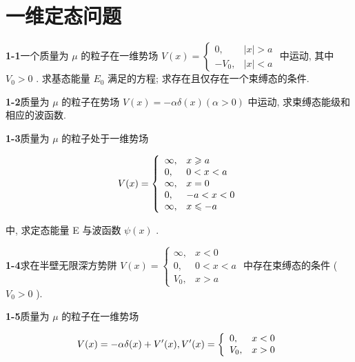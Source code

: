 \chapter{一维定态问题}

\newpage


\textbf{1-1}\quad 一个质量为 $\displaystyle \mu$ 的粒子在一维势场 $\displaystyle V(x) = \begin{cases} 0, & |x| > a \\ -V_0, & |x| < a \end{cases}$ 中运动, 其中 $\displaystyle V_0 > 0$ . 求基态能量 $\displaystyle E_0$ 满足的方程; 求存在且仅存在一个束缚态的条件.

\vfill

\newpage

\textbf{1-2}\quad 质量为 $\displaystyle \mu$ 的粒子在势场 $\displaystyle V(x) = -\alpha \delta (x)(\alpha >0)$ 中运动, 求束缚态能级和相应的波函数.

\vfill

\newpage

\textbf{1-3}\quad 质量为 $\displaystyle \mu$ 的粒子处于一维势场

$$
V (x) = \left\{ \begin{array}{l l} \infty , & x \geqslant a \\ 0, & 0 <   x <   a \\ \infty , & x = 0 \\ 0, & - a <   x <   0 \\ \infty , & x \leqslant - a \end{array} \right.
$$

中, 求定态能量 E 与波函数 $\displaystyle \psi(x)$ .

\vfill

\newpage

\textbf{1-4}\quad 求在半壁无限深方势阱 $\displaystyle V(x) = \begin{cases} \infty, & x < 0 \\ 0, & 0 < x < a \\ V_0, & x > a \end{cases}$ 中存在束缚态的条件 ( $\displaystyle V_0 > 0$ ).

\vfill

\newpage

\textbf{1-5}\quad 质量为 $\displaystyle \mu$ 的粒子在一维势场

$$
V (x) = - \alpha \delta (x) + V ^ {\prime} (x), V ^ {\prime} (x) = \left\{ \begin{array}{l l} 0, & x <   0 \\ V _ {0}, & x > 0 \end{array} \right.
$$

